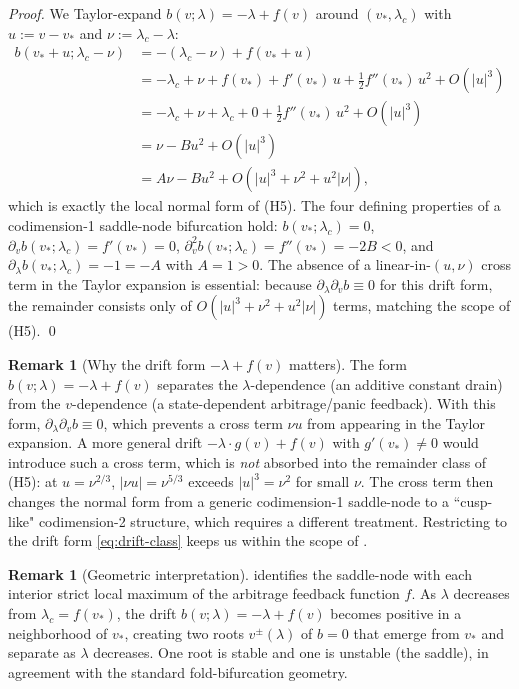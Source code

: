 \documentclass[11pt,a4paper]{article}
\theoremstyle{plain}
\theoremstyle{definition}
\newtheorem{remark}[theorem]{Remark}
\begin{document}
\begin{proof}
We Taylor-expand $b(v;\lambda) = -\lambda + f(v)$ around $(v_*, \lambda_c)$ with $u := v - v_*$ and $\nu := \lambda_c - \lambda$:
\begin{align*}
b(v_*+u;\lambda_c-\nu) &= -(\lambda_c - \nu) + f(v_*+u)\\
&= -\lambda_c + \nu + f(v_*) + f'(v_*)\,u + \tfrac{1}{2}f''(v_*)\,u^2 + O(|u|^3)\\
&= -\lambda_c + \nu + \lambda_c + 0 + \tfrac{1}{2}f''(v_*)\,u^2 + O(|u|^3) \tag*{(using $f(v_*)=\lambda_c, f'(v_*)=0$)}\\
&= \nu - B u^2 + O(|u|^3)\\
&= A\nu - B u^2 + O(|u|^3 + \nu^2 + u^2|\nu|), \tag*{(using $A = 1$)}
\end{align*}
which is exactly the local normal form of (H5). The four defining properties of a codimension-1 saddle-node bifurcation hold: $b(v_*;\lambda_c) = 0$, $\partial_v b(v_*;\lambda_c) = f'(v_*) = 0$, $\partial_v^2 b(v_*;\lambda_c) = f''(v_*) = -2B < 0$, and $\partial_\lambda b(v_*;\lambda_c) = -1 = -A$ with $A = 1 > 0$. The absence of a linear-in-$(u,\nu)$ cross term in the Taylor expansion is essential: because $\partial_\lambda\partial_v b \equiv 0$ for this drift form, the remainder consists only of $O(|u|^3 + \nu^2 + u^2|\nu|)$ terms, matching the scope of (H5).
\qed
\end{proof}

\begin{remark}[Why the drift form $-\lambda + f(v)$ matters]
The form $b(v;\lambda) = -\lambda + f(v)$ separates the $\lambda$-dependence (an additive constant drain) from the $v$-dependence (a state-dependent arbitrage/panic feedback). With this form, $\partial_\lambda\partial_v b \equiv 0$, which prevents a cross term $\nu u$ from appearing in the Taylor expansion. A more general drift $-\lambda\cdot g(v) + f(v)$ with $g'(v_*) \neq 0$ would introduce such a cross term, which is \emph{not} absorbed into the remainder class of (H5): at $u = \nu^{2/3}$, $|\nu u| = \nu^{5/3}$ exceeds $|u|^3 = \nu^2$ for small $\nu$. The cross term then changes the normal form from a generic codimension-1 saddle-node to a ``cusp-like" codimension-2 structure, which requires a different treatment. Restricting to the drift form \eqref{eq:drift-class} keeps us within the scope of .
\end{remark}

\begin{remark}[Geometric interpretation]
 identifies the saddle-node with each interior strict local maximum of the arbitrage feedback function $f$. As $\lambda$ decreases from $\lambda_c = f(v_*)$, the drift $b(v;\lambda) = -\lambda + f(v)$ becomes positive in a neighborhood of $v_*$, creating two roots $v^\pm(\lambda)$ of $b = 0$ that emerge from $v_*$ and separate as $\lambda$ decreases. One root is stable and one is unstable (the saddle), in agreement with the standard fold-bifurcation geometry.
\end{remark}
\end{document}
